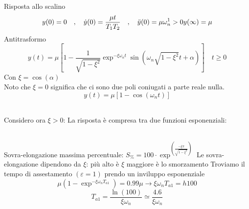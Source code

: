 \begin{enumerate}
\begin{equation*}
		\end{equation*}
			\subitem Risposta allo scalino
			\[y(0) = 0 \quad,\quad \dot y(0) = \frac{\mu t}{T_1T_2}\quad,\quad \ddot y(0)=\mu\omega_n^1>0\\y(\infty) = \mu\]
			Antitrasformo
			\[y(t)=\mu\left[1- \frac{1}{\sqrt{1-\xi^2}}\exp^{-\xi\omega_nt}\sin(\omega_n\sqrt{1-\xi^2}t+\alpha)\right]\quad t\geq0\]
			Con $\xi = \cos(\alpha)$\\
			Noto che $\xi=0$ significa che ci sono due poli coniugati a parte reale nulla.
			\[y(t) = \mu [1-\cos(\omega_nt)]\]
			\\
			Considero ora $\xi > 0 $: La risposta è compresa tra due funzioni esponenziali:\\
			\\
			Sovra-elongazione massima percentuale: $S_\%=100\cdot \exp^{(\frac{-\xi\pi}{\sqrt{1-\xi^2}})} $
			Le sovra-elongazione dipendono da $\xi$: più alto è $\xi$ maggiore è lo smorzamento
			Troviamo il tempo di assestamento $(\varepsilon=1)$ prendo un inviluppo esponenziale
			\[\mu (1-\exp^{-\xi\omega_nT_{a1}})=0.99\mu \to \xi \omega_nT_{a1} = h 100\]
			\[T_{a1} = \frac{\ln(100)}{\xi\omega_n}\simeq \frac{4.6}{\xi\omega_n}\]
	\end{enumerate}

